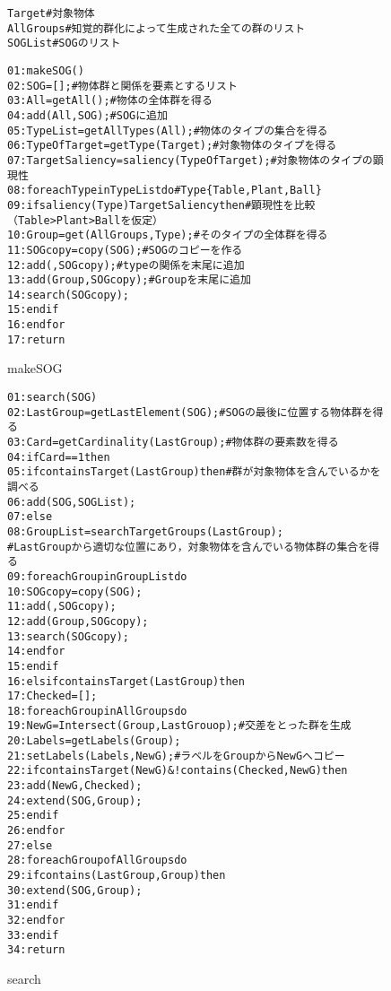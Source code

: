 \documentclass[japanese]{jnlp_1.2}
\def\rel#1{}
\def\izyo{}
\def\oneof{}
\def\extrel{}
\begin{document}
\begin{center}
\begin{figure}[t]
    {\small \setlength{\baselineskip}{13pt}
\begin{alltt}
Target      # 対象物体
AllGroups   # 知覚的群化によって生成された全ての群のリスト
SOGList     # SOGのリスト

01:makeSOG()
02:  SOG = [ ];                                 # 物体群と関係を要素とするリスト
03:  All = getAll();                            # 物体の全体群を得る
04:  add(All, SOG);                             # SOGに追加
05:  TypeList = getAllTypes(All);               # 物体のタイプの集合を得る
06:  TypeOfTarget = getType(Target);            # 対象物体のタイプを得る
07:  TargetSaliency = saliency(TypeOfTarget);   # 対象物体のタイプの顕現性
08:  for each Type in TypeList do               # Type\oneof\{Table, Plant, Ball\}
09:    if saliency(Type){\izyo}TargetSaliency then   # 顕現性を比較（Table>Plant>Ballを仮定）
10:      Group = get(AllGroups, Type);          # そのタイプの全体群を得る
11:      SOGcopy = copy(SOG);                   # SOGのコピーを作る
12:      add(\rel{\mathtt{type}}, SOGcopy);                     # typeの関係を末尾に追加
13:      add(Group, SOGcopy);                   # Groupを末尾に追加
14:      search(SOGcopy);
15:    end if
16:  end for
17:return
\end{alltt}
}
\caption{makeSOG}
\label{fig:makeSOG}
\end{figure}

\begin{figure}[t]
    {\small \setlength{\baselineskip}{13pt}
\begin{alltt}
01:search(SOG)
02:  LastGroup = getLastElement(SOG);      # SOGの最後に位置する物体群を得る
03:  Card = getCardinality(LastGroup);     # 物体群の要素数を得る
04:  if Card == 1 then
05:    if containsTarget(LastGroup) then   # 群が対象物体を含んでいるかを調べる
06:      add(SOG, SOGList);
07:    else
08:      GroupList = searchTargetGroups(LastGroup);
           # LastGroupから適切な位置にあり，対象物体を含んでいる物体群の集合を得る
09:      for each Group in GroupList do
10:        SOGcopy = copy(SOG);
11:        add(\extrel, SOGcopy);
12:        add(Group, SOGcopy);
13:        search(SOGcopy);
14:      end for
15:    end if
16:  elsif containsTarget(LastGroup) then
17:    Checked = [ ];
18:    for each Group in AllGroups do
19:      NewG = Intersect(Group, LastGrouop);  # 交差をとった群を生成
20:      Labels = getLabels(Group);
21:      setLabels(Labels, NewG);              # ラベルをGroupからNewGへコピー
22:      if containsTarget(NewG) \& !contains(Checked, NewG) then
23:        add(NewG, Checked);
24:        extend(SOG, Group);
25:      end if
26:    end for
27:  else
28:    for each Group of AllGroups do
29:      if contains(LastGroup, Group) then
30:        extend(SOG, Group);
31:      end if
32:    end for
33:  end if
34:return
\end{alltt}
}
\caption{search}
\label{fig:search}
\end{figure}


\end{center}
\end{document}
